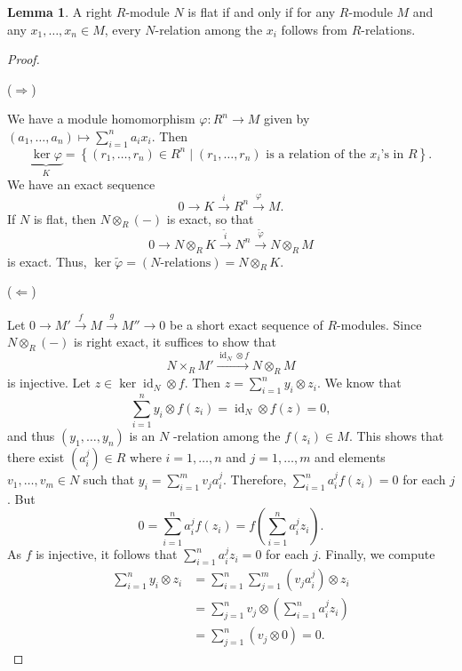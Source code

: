 \documentclass[10pt,letterpaper,cm]{nupset}
\theoremstyle{definition}
\theoremstyle{theorem}
\newtheorem{lemma}[definition]{Lemma}
\theoremstyle{remark}
\newcommand{\1}{\mathbf{1}}
\newcommand{\0}{\vec 0}
\DeclareMathOperator{\id}{id}
\begin{document}
\begin{lemma}
A right $R$-module $N$ is flat if and only if for any $R$-module $M$ and any $x_1, \ldots, x_n \in M$, every $N$-relation among the $x_i$ follows from $R$-relations. 
\end{lemma}
\begin{proof} $ $

($\Longrightarrow$) 

We have a module homomorphism $\varphi : R^n \to M$ given by $\left(a_1, \ldots, a_n\right)\mapsto \sum_{i=1}^na_ix_i$. Then $$\underbrace{\ker{\varphi}}_{K}= \left\{(r_1, \ldots, r_n)\in R^n \mid (r_1, \ldots, r_n) \text{ is a relation of the }x_i\text{'s in }R\right\}.$$ We have an exact sequence $$ 0 \to K \overset{i}{\longrightarrow} R^n \overset{\varphi}{\longrightarrow} M  .$$ If $N$ is flat, then $N\otimes_R (-)$ is exact, so that $$ 0 \to N\otimes_R K \overset{\tilde{i}}{\longrightarrow} N^n \overset{\tilde{\varphi}}{\longrightarrow} N\otimes_R M  $$ is exact. Thus, $\ker{\tilde{\varphi}} = \left(N\text{-relations}\right) = N\otimes_R K$.

\medskip

($\Longleftarrow$)

 Let $0 \to M' \overset{f}{\longrightarrow}  M  \overset{g}{\longrightarrow} M'' \to 0$ be a short exact sequence of $R$-modules. Since $N \otimes_R (-)$ is right exact, it suffices to show that $$N \times_R M' \overset{\id_N \otimes f}{\longrightarrow} N\otimes_RM$$ is injective. Let $z\in \ker{\id_N \otimes f}$. Then $z= \sum_{i=1}^n y_i \otimes z_i$. We know that $$\sum_{i=1}^n y_i \otimes f(z_i) = \id_N \otimes f(z) =0,$$ and thus $\left(y_1, \ldots, y_n\right)$ is an $N$ -relation among the $f(z_i)\in M$. This shows that there exist $\left(a_i^j\right) \in R$ where $i=1, \ldots, n$ and $j=1, \ldots, m$ and elements $v_1, \ldots, v_m \in N$ such that $y_i = \sum_{i=1}^m v_ja_i^j$. Therefore, $\sum_{i=1}^n a_i^jf(z_i) = 0$ for each $j$. But $$0 = \sum_{i=1}^n a_i^j f(z_i) = f\left(\sum_{i=1}^n a_i^j z_i \right).$$ As $f$ is injective, it follows that $\sum_{i=1}^n a_i^jz_i = 0$ for each $j$. Finally, we compute 
 \begin{align*}
 \sum_{i=1}^n y_i \otimes z_i & = \sum_{i=1}^n \sum_{j=1}^m (v_ja_i^j) \otimes z_i 
 \\ & = \sum_{j=1}^n v_j \otimes \left(\sum_{i=1}^n a_i^j z_i \right) 
 \\ & = \sum_{j=1}^n (v_j \otimes 0) = 0.
 \end{align*}
\end{proof}
\end{document}
